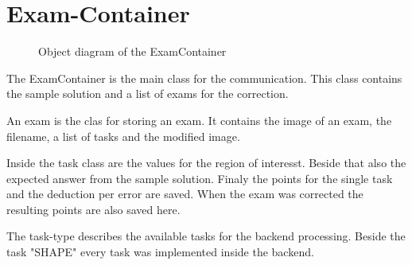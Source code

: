 \author{Florian Müller and Paul Hoffmann}
\chapter{Exam-Container}

\begin{figure}[H]
    \centering
    \caption{Object diagram of the ExamContainer}
\end{figure}

The ExamContainer is the main class for the communication.
This class contains the sample solution and a list of exams for the correction.

An exam is the clas for storing an exam.
It contains the image of an exam, the filename, a list of tasks and the modified image.

Inside the task class are the values for the region of interesst.
Beside that also the expected answer from the sample solution.
Finaly the points for the single task and the deduction per error are saved.
When the exam was corrected the resulting points are also saved here.

The task-type describes the available tasks for the backend processing.
Beside the task "SHAPE" every task was implemented inside the backend.
